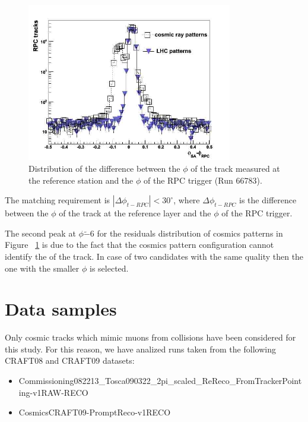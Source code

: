 \begin{figure}[hbtp]
  \begin{center}%
    \includegraphics[width=0.8\textwidth]{residuals_rpc}
    \hspace{1cm}
    \caption{Distribution of the difference between the $\phi$ of the track measured at the reference station and the $\phi$ of the RPC trigger (Run 66783).}
    \label{fig:trigger_residuals}
  \end{center}
\end{figure}

The matching requirement is $|\Delta\phi_{t-RPC}| < 30^\circ$,
where $\Delta\phi_{t-RPC}$ is the difference 
between the $\phi$ of the track at the reference layer 
and the $\phi$ of the RPC trigger.

The second peak at $\phi  \tilde -6$ for the residuals distribution
 of cosmics patterns in Figure ~\ref{fig:trigger_residuals} is due
to the fact that the cosmics 
pattern configuration cannot identify the \pt of the track.
In case of  two candidates with the same quality then the one
with the smaller $\phi$ is selected.



\section{Data samples}
Only cosmic tracks which mimic muons from collisions
have been considered for this study. 
For this reason, we have analized runs taken from the 
following CRAFT08 and CRAFT09 datasets:
\begin{itemize}
\item
Commissioning08\/2213\_Tosca090322\_2pi\_scaled\_ReReco\_FromTrackerPointing-v1\/RAW-RECO
\item
Cosmics\/CRAFT09-PromptReco-v1\/RECO
\end{itemize}

